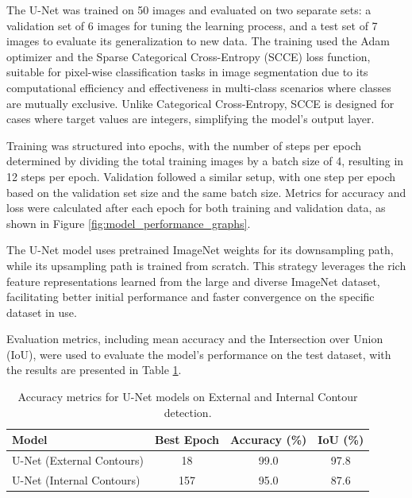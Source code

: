 \documentclass[preprint,12pt]{elsarticle}
\begin{document}
The U-Net was trained on 50 images and evaluated on two separate sets: a validation set of 6 images for tuning the learning process, and a test set of 7 images to evaluate its generalization to new data. The training used the Adam optimizer and the Sparse Categorical Cross-Entropy (SCCE) loss function, suitable for pixel-wise classification tasks in image segmentation due to its computational efficiency and effectiveness in multi-class scenarios where classes are mutually exclusive. Unlike Categorical Cross-Entropy, SCCE is designed for cases where target values are integers, simplifying the model's output layer.

Training was structured into epochs, with the number of steps per epoch determined by dividing the total training images by a batch size of 4, resulting in 12 steps per epoch. Validation followed a similar setup, with one step per epoch based on the validation set size and the same batch size. Metrics for accuracy and loss were calculated after each epoch for both training and validation data, as shown in Figure \ref{fig:model_performance_graphs}.

The U-Net model uses pretrained ImageNet weights for its downsampling path, while its upsampling path is trained from scratch. This strategy leverages the rich feature representations learned from the large and diverse ImageNet dataset, facilitating better initial performance and faster convergence on the specific dataset in use.

Evaluation metrics, including mean accuracy and the Intersection over Union (IoU), were used to evaluate the model's performance on the test dataset, with the results are presented in Table \ref{tab:unet_performance}.

\begin{table}[ht]
\centering
\begin{tabular}{lccc}
\hline
Model & Best Epoch & Accuracy (\%) & IoU (\%) \\ \hline
U-Net (External Contours) & 18 & 99.0 & 97.8 \\
U-Net (Internal Contours) & 157 & 95.0 & 87.6 \\ \hline
\end{tabular}
\caption{Accuracy metrics for U-Net models on External and Internal Contour detection.}
\label{tab:unet_performance}
\end{table}
\end{document}
